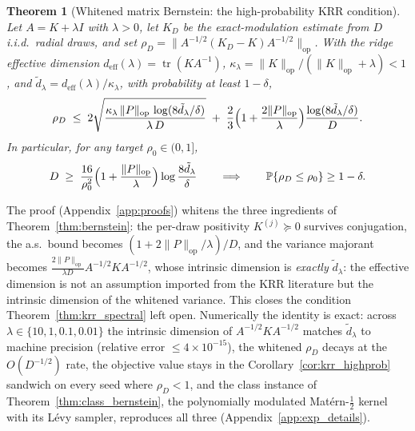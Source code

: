 \documentclass{article}
\newtheorem{theorem}{Theorem}[section]
\begin{document}
\begin{theorem}[Whitened matrix Bernstein: the high-probability KRR condition]\label{thm:krr_whitened}
Let $A=K+\lambda I$ with $\lambda>0$, let $K_D$ be the exact-modulation estimate from $D$ i.i.d.\ radial draws, and set $\rho_D=\|A^{-1/2}(K_D-K)A^{-1/2}\|_{\mathrm{op}}$. With the ridge effective dimension $d_{\mathrm{eff}}(\lambda)=\operatorname{tr}(KA^{-1})$, $\kappa_\lambda=\|K\|_{\mathrm{op}}/(\|K\|_{\mathrm{op}}+\lambda)<1$, and $\tilde d_\lambda=d_{\mathrm{eff}}(\lambda)/\kappa_\lambda$, with probability at least $1-\delta$,
\begin{equation}\label{eq:whitened_tail}
\rho_D\;\le\;2\sqrt{\frac{\kappa_\lambda\,\|P\|_{\mathrm{op}}\,\log(8\tilde d_\lambda/\delta)}{\lambda\,D}}\;+\;\frac{2}{3}\Bigl(1+\frac{2\|P\|_{\mathrm{op}}}{\lambda}\Bigr)\frac{\log(8\tilde d_\lambda/\delta)}{D}.
\end{equation}
In particular, for any target $\rho_0\in(0,1]$,
\begin{equation}\label{eq:whitened_count}
D\;\ge\;\frac{16}{\rho_0^{2}}\Bigl(1+\frac{\|P\|_{\mathrm{op}}}{\lambda}\Bigr)\log\frac{8\tilde d_\lambda}{\delta}
\qquad\Longrightarrow\qquad \mathbb{P}\{\rho_D\le\rho_0\}\ge1-\delta.
\end{equation}
\end{theorem}
\noindent The proof (Appendix~\ref{app:proofs}) whitens the three ingredients of Theorem~\ref{thm:bernstein}: the per-draw positivity $K^{(j)}\succeq0$ survives conjugation, the a.s.\ bound becomes $(1+2\|P\|_{\mathrm{op}}/\lambda)/D$, and the variance majorant becomes $\frac{2\|P\|_{\mathrm{op}}}{\lambda D}A^{-1/2}KA^{-1/2}$, whose intrinsic dimension is \emph{exactly} $\tilde d_\lambda$: the effective dimension is not an assumption imported from the KRR literature but the intrinsic dimension of the whitened variance. This closes the condition Theorem~\ref{thm:krr_spectral} left open. Numerically the identity is exact: across $\lambda\in\{10,1,0.1,0.01\}$ the intrinsic dimension of $A^{-1/2}KA^{-1/2}$ matches $\tilde d_\lambda$ to machine precision (relative error $\le4\times10^{-15}$), the whitened $\rho_D$ decays at the $O(D^{-1/2})$ rate, the objective value stays in the Corollary~\ref{cor:krr_highprob} sandwich on every seed where $\rho_D<1$, and the class instance of Theorem~\ref{thm:class_bernstein}, the polynomially modulated Mat\'ern-$\tfrac12$ kernel with its L\'evy sampler, reproduces all three (Appendix~\ref{app:exp_details}).
\end{document}
